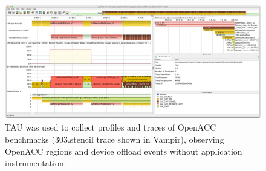 \begin{figure}[htb]
\centering
\includegraphics[width=6in]{projects/2.3.2-Tools/2.3.2.10-PROTEAS-YTUNE/clacc_tau.png}
\caption{TAU was used to collect profiles and traces of OpenACC benchmarks (303.stencil trace shown in Vampir), observing OpenACC regions and device offload events without application instrumentation.}
\label{figure:tau:clacc}
\end{figure}

